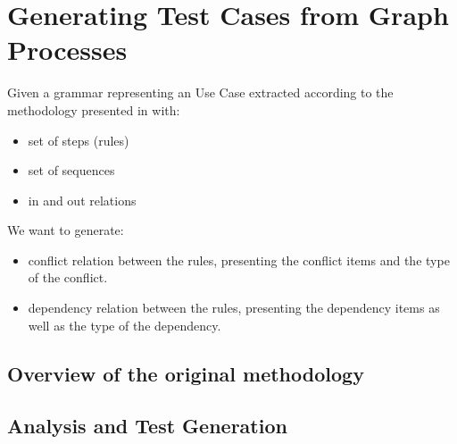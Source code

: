 \chapter{Generating Test Cases from Graph Processes}

Given a grammar representing an Use Case extracted according to the methodology presented in \cite{Junior2015} with:

\begin{itemize}
\item set of steps (rules)
\item set of sequences
\item in and out relations
\end{itemize}

We want to generate:

\begin{itemize}
\item conflict relation between the rules, presenting the conflict items and the type of the conflict.
\item dependency relation between the rules, presenting the dependency items as well as the type of the dependency.
\end{itemize}

\section{Overview of the original methodology}

\section{Analysis and Test Generation}





